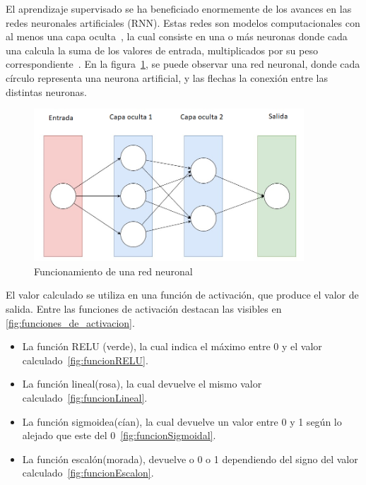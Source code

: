     El aprendizaje supervisado se ha beneficiado enormemente de los avances en las redes neuronales artificiales (RNN). Estas redes son modelos computacionales  con al menos una capa oculta~\cite{definicion_neural_network}, la cual consiste en una o más neuronas donde cada una calcula la suma de los valores de entrada, multiplicados por su peso correspondiente~\cite{definicion_hidden_layer}. En la figura~\ref{fig:funcionamientoRedNeuronal}, se puede observar una red neuronal, donde cada círculo representa una neurona artificial, y las flechas la conexión entre las distintas neuronas.

    \begin{figure}[!ht]
         \centering
         \includegraphics[width=0.9\textwidth]{img/RedNeuronal.png}
         \caption{Funcionamiento de una red neuronal}
         \label{fig:funcionamientoRedNeuronal}
    \end{figure}
    El valor calculado se utiliza en una función de activación, que produce el valor de salida\cite{definicion_activation_function}. Entre las funciones de activación destacan las visibles en \ref{fig:funciones_de_activacion}.
    \begin{itemize}
        \item La función RELU (verde), la cual indica el máximo entre 0 y el valor calculado~\ref{fig:funcionRELU}.
        \item La función lineal(rosa), la cual devuelve el mismo valor calculado~\ref{fig:funcionLineal}.
        \item La función sigmoidea(cían), la cual devuelve un valor entre 0 y 1 según lo alejado que este del 0~\ref{fig:funcionSigmoidal}.
        \item La función escalón(morada), devuelve o 0 o 1 dependiendo del signo del valor calculado~\ref{fig:funcionEscalon}.
    \end{itemize}
    
